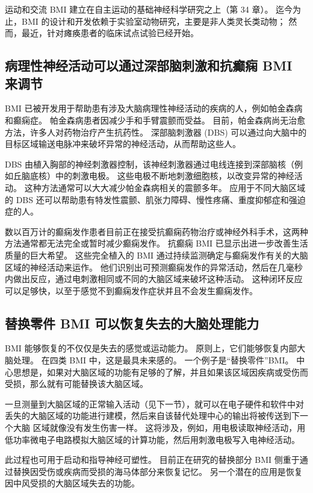 运动和交流 BMI 建立在自主运动的基础神经科学研究之上（第 34 章）。 迄今为止，BMI 的设计和开发依赖于实验室动物研究，主要是非人类灵长类动物； 然而，最近，针对瘫痪患者的临床试点试验已经开始。

\subsection{病理性神经活动可以通过深部脑刺激和抗癫痫 BMI 来调节}
BMI 已被开发用于帮助患有涉及大脑病理性神经活动的疾病的人，例如帕金森病和癫痫症。 帕金森病患者因减少手和手臂震颤而受益。 目前，帕金森病尚无治愈方法，许多人对药物治疗产生抗药性。 深部脑刺激器 (DBS) 可以通过向大脑中的目标区域输送电脉冲来破坏异常的神经活动，从而帮助这些人。

DBS 由植入胸部的神经刺激器控制，该神经刺激器通过电线连接到深部脑核（例如丘脑底核）中的刺激电极。 这些电极不断地刺激细胞核，以改变异常的神经活动。 这种方法通常可以大大减少帕金森病相关的震颤多年。 应用于不同大脑区域的 DBS 还可以帮助患有特发性震颤、肌张力障碍、慢性疼痛、重度抑郁症和强迫症的人。

数以百万计的癫痫发作患者目前正在接受抗癫痫药物治疗或神经外科手术，这两种方法通常都无法完全或暂时减少癫痫发作。 抗癫痫 BMI 已显示出进一步改善生活质量的巨大希望。 这些完全植入的 BMI 通过持续监测确定与癫痫发作有关的大脑区域的神经活动来运作。 他们识别出可预测癫痫发作的异常活动，然后在几毫秒内做出反应，通过电刺激相同或不同的大脑区域来破坏这种活动。 这种闭环反应可以足够快，以至于感觉不到癫痫发作症状并且不会发生癫痫发作。

\subsection{替换零件 BMI 可以恢复失去的大脑处理能力}
BMI 能够恢复的不仅仅是失去的感觉或运动能力。 原则上，它们能够恢复内部大脑处理。 在四类 BMI 中，这是最具未来感的。 一个例子是“替换零件”BMI。 中心思想是，如果对大脑区域的功能有足够的了解，并且如果该区域因疾病或受伤而受损，那么就有可能替换该大脑区域。

一旦测量到大脑区域的正常输入活动（见下一节），就可以在电子硬件和软件中对丢失的大脑区域的功能进行建模，然后来自该替代处理中心的输出将被传送到下一个大脑 区域就像没有发生伤害一样。 这将涉及，例如，用电极读取神经活动，用低功率微电子电路模拟大脑区域的计算功能，然后用刺激电极写入电神经活动。

此过程也可用于启动和指导神经可塑性。 目前正在研究的替换部分 BMI 侧重于通过替换因受伤或疾病而受损的海马体部分来恢复记忆。 另一个潜在的应用是恢复因中风受损的大脑区域失去的功能。

